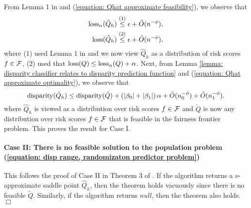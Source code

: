 \documentclass{article}
\begin{document}
From Lemma 1 in \cite{AgarwalEtAl(19)-FairRegression} and (\ref{equation: Qhat approximate feasibility}), we observe that 
        \begin{align*}
            \operatorname{loss}_{\alpha}(\hat{Q}_h) &\overset{(1)}{\leq} \epsilon + \tilde{O}(n^{-\phi}), \\
            \operatorname{loss}(\hat{Q}_h) &\overset{(2)}{\leq} \epsilon + \tilde{O}(n^{-\phi}),
        \end{align*}
where (1) used Lemma 1 in \cite{AgarwalEtAl(19)-FairRegression} and we now view $\hat{Q}_h$ as a distribution of risk scores $f \in \mathcal{F}$, (2) used that $\operatorname{loss}(Q) \leq \operatorname{loss}_\alpha(Q) + \alpha$. Next, from Lemma \ref{lemma: disparity classifier relates to disparity prediction function} and (\ref{equation: Qhat approximate optimality}), we observe that
        \begin{equation*}
            \operatorname{disparity}(\hat{Q}_h) \leq \operatorname{disparity}(\tilde Q) + \left( |\beta_0| + |\beta_1| \right) \alpha + \tilde{O}(n_0^{-\phi}) + \tilde{O}(n_1^{-\phi}). 
        \end{equation*}
where $\hat{Q}_h$ is viewed as a distribution over risk scores $f \in \mathcal{F}$ and $\tilde Q$ is now any distribution over risk scores $f \in \mathcal{F}$ that is feasible in the fairness frontier problem. This proves the result for Case I.
    
\paragraph{Case II: There is no feasible solution to the population problem (\ref{equation: disp range, randomizaton predictor problem})} This follows the proof of Case II in Theorem 3 of \cite{AgarwalEtAl(19)-FairRegression}. If the algorithm returns a $\nu$-approximate saddle point $\hat{Q}_h$, then the theorem holds vacuously since there is no feasible $\tilde Q$. Similarly, if the algorithm returns $null$, then the theorem also holds. $\Box$

\end{document}
